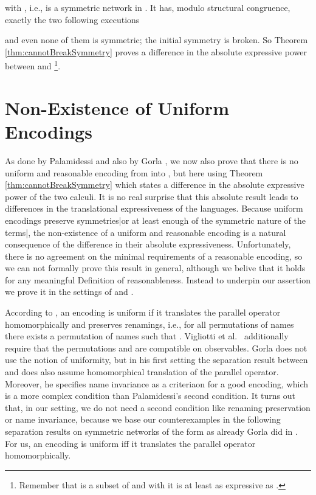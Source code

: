 \documentclass[11pt,techReport]{eptcs}
\begin{document}
with , i.e.,  is a symmetric network in . It has, modulo structural congruence, exactly the two following executions 

and even none of them is symmetric; the initial symmetry is broken.  So Theorem \ref{thm:cannotBreakSymmetry} proves a difference in the absolute expressive power between \pisep and \pimix\footnote{Remember that \pisep is a subset of \pimix and with it \pimix is at least as expressive as \pisep.}.


\section{Non-Existence of Uniform Encodings} \label{sec:nonExistUniformEncoding}

As done by Palamidessi \cite{palamidessi03} and also by Gorla \cite{gorla08d}, we now also prove that there is no uniform and reasonable encoding from \pimix into \pisep, but here using Theorem \ref{thm:cannotBreakSymmetry} which states a difference in the absolute expressive power of the two calculi.  It is no real surprise that this absolute result leads to differences in the translational expressiveness of the languages. Because uniform encodings preserve symmetries|or at least enough of the symmetric nature of the terms|, the non-existence of a uniform and reasonable encoding is a natural consequence of the difference in their absolute expressiveness. Unfortunately, there is no agreement on the minimal requirements of a reasonable encoding, so we can not formally prove this result in general, although we belive that it holds for any meaningful Definition of reasonableness. Instead to underpin our assertion we prove it in the settings of \cite{palamidessi03} and \cite{gorla08d}.

According to \cite{palamidessi03}, an encoding is uniform if it translates the parallel operator homomorphically and preserves renamings, i.e., for all permutations of names  there exists a permutation of names  such that . Vigliotti et al.~\cite{vigliottiPhillipsPalamidessi07} additionally require that the permutations  and  are compatible on observables. Gorla \cite{gorla08d} does not use the notion of uniformity, but in his first setting the separation result between \pimix and \pisep does also assume homomorphical translation of the parallel operator. Moreover, he specifies name invariance as a criteriaon for a good encoding, which is a more complex condition than  Palamidessi's second condition. It turns out that, in our setting, we do not need a second condition like renaming preservation or name invariance, because we base our counterexamples in the following separation results on symmetric networks of the form  as already Gorla did in \cite{gorla08d}.  For us, an encoding is uniform iff it translates the parallel operator homomorphically.
\end{document}
